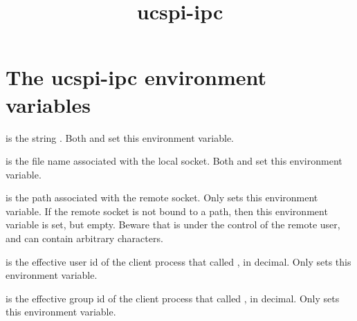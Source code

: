 \documentclass{book}
\title{ucspi-ipc}
\begin{document}
\section{The ucspi-ipc environment variables}

 is the string .  Both  and
 set this environment variable.

 is the file name associated with the local
socket.  Both  and  set this environment
variable.

 is the path associated with the remote socket.
Only  sets this environment variable.  If the remote
socket is not bound to a path, then this environment variable is set,
but empty.  Beware that  is under the control of
the remote user, and can contain arbitrary characters.

 is the effective user id of the client process
that called , in decimal.  Only  sets this
environment variable.

 is the effective group id of the client process
that called , in decimal.  Only  sets this
environment variable.
\end{document}
